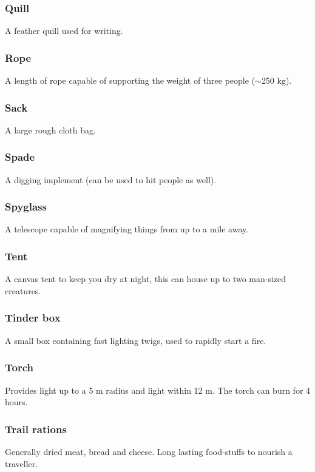 \documentclass[a4paper,11pt,oneside]{book}
\newcommand{\textlf}[1]{\textbf{\titlecap{#1}}}
\begin{document}
\subsubsection{Quill}
A feather quill used for writing.

\subsubsection{Rope}
A length of rope capable of supporting the weight of three people ($\sim$250 kg).

\subsubsection{Sack}
A large rough cloth bag.

\subsubsection{Spade}
A digging implement (can be used to hit people as well).

\subsubsection{Spyglass}
A telescope capable of magnifying things from up to a mile away.

\subsubsection{Tent}
A canvas tent to keep you dry at night, this can house up to two man-sized creatures.

\subsubsection{Tinder box}
A small box containing fast lighting twigs, used to rapidly start a fire.

\subsubsection{Torch}
Provides \textlf{full} light up to a 5 m radius and \textlf{low} light within 12 m. The torch can burn for 4 hours.

\subsubsection{Trail rations}
Generally dried meat, bread and cheese. Long lasting food-stuffs to nourish a traveller.
\end{document}
